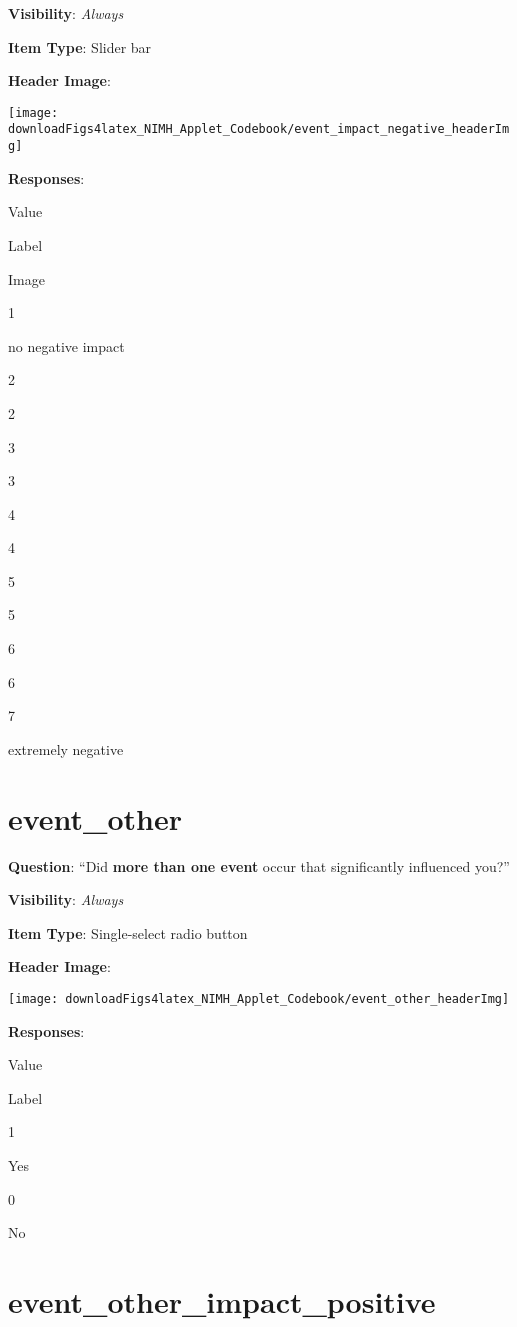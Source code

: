 \documentclass[]{book}
\begin{document}
\textbf{Visibility}: \emph{Always}

\textbf{Item Type}: Slider bar

\textbf{Header Image}:

\begin{flushleft}\texttt{[image: downloadFigs4latex\_NIMH\_Applet\_Codebook/event\_impact\_negative\_headerImg]} \end{flushleft}

\textbf{Responses}:

Value

Label

Image

1

no negative impact

2

2

3

3

4

4

5

5

6

6

7

extremely negative

\hypertarget{event_other}{%
\section{event\_other}\label{event_other}}

\textbf{Question}: ``Did \textbf{more than one event} occur that significantly influenced you?''

\textbf{Visibility}: \emph{Always}

\textbf{Item Type}: Single-select radio button

\textbf{Header Image}:

\begin{flushleft}\texttt{[image: downloadFigs4latex\_NIMH\_Applet\_Codebook/event\_other\_headerImg]} \end{flushleft}

\textbf{Responses}:

Value

Label

1

Yes

0

No

\hypertarget{event_other_impact_positive}{%
\section{event\_other\_impact\_positive}\label{event_other_impact_positive}}
\end{document}
